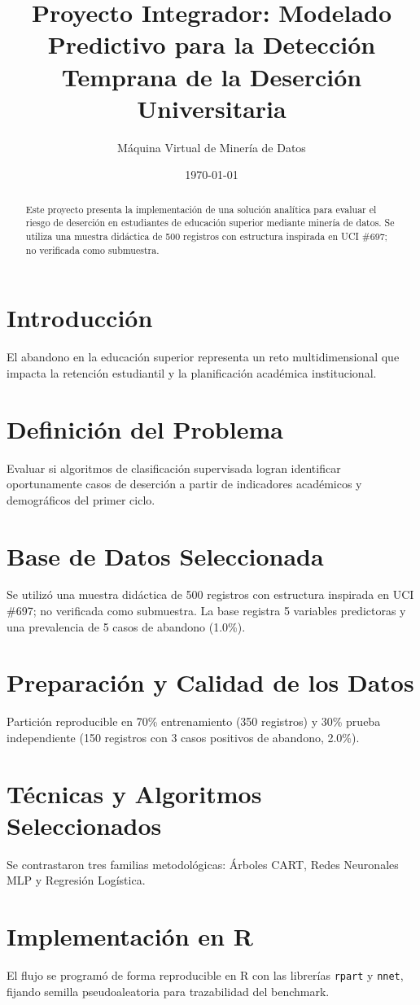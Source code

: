 \documentclass[11pt,a4paper]{article}
\title{\textbf{Proyecto Integrador: Modelado Predictivo para la Detección Temprana de la Deserción Universitaria}}
\author{Máquina Virtual de Minería de Datos}
\date{\today}
\begin{document}
\maketitle
\begin{abstract}
Este proyecto presenta la implementación de una solución analítica para evaluar el riesgo de deserción en estudiantes de educación superior mediante minería de datos. Se utiliza una muestra didáctica de 500 registros con estructura inspirada en UCI \#697; no verificada como submuestra.
\end{abstract}
\section{Introducción}
El abandono en la educación superior representa un reto multidimensional que impacta la retención estudiantil y la planificación académica institucional.
\section{Definición del Problema}
Evaluar si algoritmos de clasificación supervisada logran identificar oportunamente casos de deserción a partir de indicadores académicos y demográficos del primer ciclo.
\section{Base de Datos Seleccionada}
Se utilizó una muestra didáctica de 500 registros con estructura inspirada en UCI \#697; no verificada como submuestra. La base registra 5 variables predictoras y una prevalencia de 5 casos de abandono (1.0\%).
\section{Preparación y Calidad de los Datos}
Partición reproducible en 70\% entrenamiento (350 registros) y 30\% prueba independiente (150 registros con 3 casos positivos de abandono, 2.0\%).
\section{Técnicas y Algoritmos Seleccionados}
Se contrastaron tres familias metodológicas: Árboles CART, Redes Neuronales MLP y Regresión Logística.
\section{Implementación en R}
El flujo se programó de forma reproducible en R con las librerías \texttt{rpart} y \texttt{nnet}, fijando semilla pseudoaleatoria para trazabilidad del benchmark.
\end{document}
